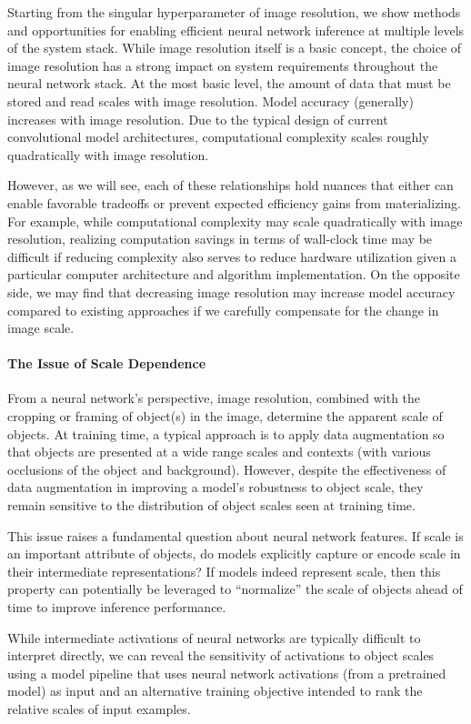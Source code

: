 Starting from the singular hyperparameter of image resolution, we show methods and opportunities for enabling efficient neural network inference at multiple levels of the system stack.
While image resolution itself is a basic concept, the choice of image resolution has a strong impact on system requirements throughout the neural network stack.
At the most basic level, the amount of data that must be stored and read scales with image resolution.
Model accuracy (generally) increases with image resolution.
Due to the typical design of current convolutional model architectures, computational complexity scales roughly quadratically with image resolution.

However, as we will see, each of these relationships hold nuances that either can enable favorable tradeoffs or prevent expected efficiency gains from materializing.
For example, while computational complexity may scale quadratically with image resolution, realizing computation savings in terms of wall-clock time may be difficult if reducing complexity also serves to reduce hardware utilization given a particular computer architecture and algorithm implementation.
On the opposite side, we may find that decreasing image resolution may increase model accuracy compared to existing approaches if we carefully compensate for the change in image scale.


\paragraph{The Issue of Scale Dependence}
From a neural network's perspective, image resolution, combined with the cropping or framing of object(s) in the image, determine the apparent scale of objects.
At training time, a typical approach is to apply data augmentation so that objects are presented at a wide range scales and contexts (with various occlusions of the object and background).
However, despite the effectiveness of data augmentation in improving a model's robustness to object scale, they remain sensitive to the distribution of object scales seen at training time.

This issue raises a fundamental question about neural network features.
If scale is an important attribute of objects, do models explicitly capture or encode scale in their intermediate representations?
If models indeed represent scale, then this property can potentially be leveraged to ``normalize'' the scale of objects ahead of time to improve inference performance.

While intermediate activations of neural networks are typically difficult to interpret directly, we can reveal the sensitivity of activations to object scales using a model pipeline that uses neural network activations (from a pretrained model) as input and an alternative training objective intended to rank the relative scales of input examples.

